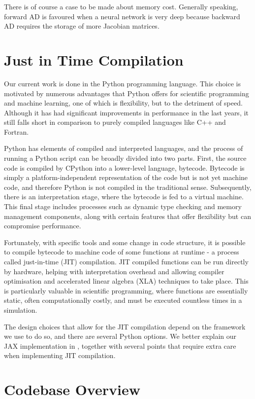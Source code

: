There is of course a case to be made about memory cost. Generally speaking, forward AD is favoured when a neural network is very deep because backward AD requires the storage of more Jacobian matrices.

\section{Just in Time Compilation}\label{sec:jit}
Our current work is done in the Python programming language. This choice is motivated by numerous advantages that Python offers for scientific programming and machine learning, one of which is flexibility, but to the detriment of speed. Although it has had significant improvements in performance in the last years, it still falls short in comparison to purely compiled languages like C++ and Fortran. 

Python has elements of compiled and interpreted languages, and the process of running a Python script can be broadly divided into two parts. First, the source code is compiled by CPython into a lower-level language, bytecode. Bytecode is simply a platform-independent representation of the code but is not yet machine code, and therefore Python is not compiled in the traditional sense. Subsequently, there is an interpretation stage, where the bytecode is fed to a virtual machine. This final stage includes processes such as dynamic type checking and memory management components, along with certain features that offer flexibility but can compromise performance.

Fortunately, with specific tools and some change in code structure, it is possible to compile bytecode to machine code of some functions at runtime - a process called just-in-time (JIT) compilation. JIT compiled functions can be run directly by hardware, helping with interpretation overhead and allowing compiler optimisation and accelerated linear algebra (XLA) techniques to take place. This is particularly valuable in scientific programming, where functions are essentially static, often computationally costly, and must be executed countless times in a simulation.

The design choices that allow for the JIT compilation depend on the framework we use to do so, and there are several Python options. We better explain our JAX \cite{bradbury2018jax} implementation in , together with several points that require extra care when implementing JIT compilation.


\section{Codebase Overview}

